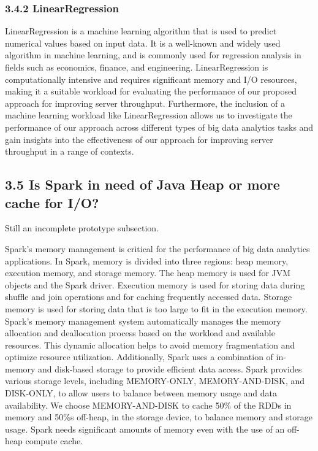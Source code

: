 \documentclass[twocolumn,10pt]{asme2e}
\begin{document}
\subsubsection*{3.4.2 LinearRegression}
LinearRegression is a machine learning algorithm that is used to predict numerical values based on input data. It is a well-known and widely used algorithm in machine learning, and is commonly used for regression analysis in fields such as economics, finance, and engineering. LinearRegression is computationally intensive and requires significant memory and I/O resources, making it a suitable workload for evaluating the performance of our proposed approach for improving server throughput. Furthermore, the inclusion of a machine learning workload like LinearRegression allows us to investigate the performance of our approach across different types of big data analytics tasks and gain insights into the effectiveness of our approach for improving server throughput in a range of contexts.

\subsection*{3.5 Is Spark in need of Java Heap or more cache for I/O?}
Still an incomplete prototype subsection.

Spark's memory management is critical for the performance of big data analytics applications. In Spark, memory is divided into three regions: heap memory, execution memory, and storage memory. The heap memory is used for JVM objects and the Spark driver. Execution memory is used for storing data during shuffle and join operations and for caching frequently accessed data. Storage memory is used for storing data that is too large to fit in the execution memory. Spark's memory management system automatically manages the memory allocation and deallocation process based on the workload and available resources. This dynamic allocation helps to avoid memory fragmentation and optimize resource utilization. Additionally, Spark uses a combination of in-memory and disk-based storage to provide efficient data access. Spark provides various storage levels, including MEMORY-ONLY, MEMORY-AND-DISK, and DISK-ONLY, to allow users to balance between memory usage and data availability. We choose MEMORY-AND-DISK to cache 50\% of the RDDs in memory and 50\%s off-heap, in the storage device, to balance memory and storage usage. Spark needs significant amounts of memory even with the use of an off-heap compute cache.
\end{document}
